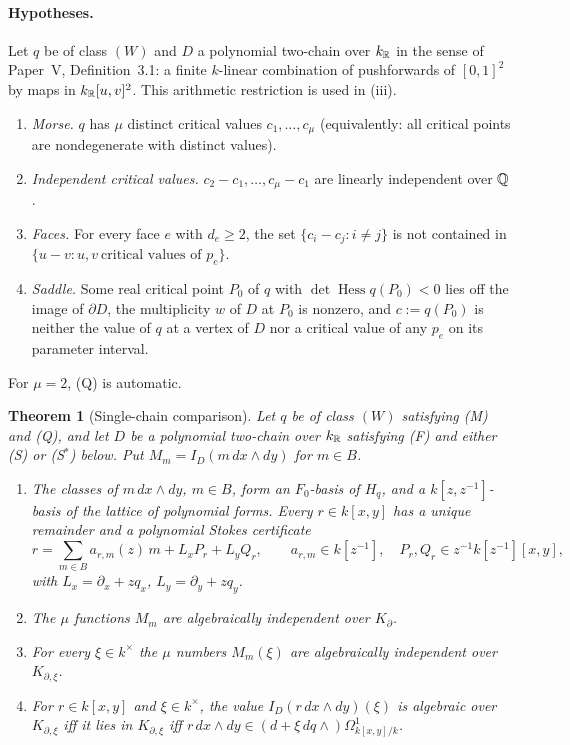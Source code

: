 \documentclass[11pt]{article}
\numberwithin{equation}{section}
\newtheorem{theorem}{Theorem}[section]
\theoremstyle{definition}
\theoremstyle{remark}
\newcommand{\Hq}{H_q}
\newcommand{\dd}{\,d}
\begin{document}
\paragraph{Hypotheses.} Let $q$ be of class $(W)$ and $D$ a polynomial two-chain
over $k_\mathbb R$ in the sense of Paper~V, Definition~3.1: a finite $k$-linear
combination of pushforwards of $[0,1]^2$ by maps in $k_\mathbb R[u,v]^2$. This
arithmetic restriction is used in (iii).
\begin{enumerate}[label=\textup{(\Alph*)},leftmargin=2.6em]
\item[(M)] \emph{Morse.} $q$ has $\mu$ distinct critical values
 $c_1,\dots,c_\mu$ (equivalently: all critical points are nondegenerate with
 distinct values).
\item[(Q)] \emph{Independent critical values.} $c_2-c_1,\dots,c_\mu-c_1$ are
 linearly independent over $\mathbb Q$.
\item[(F)] \emph{Faces.} For every face $e$ with $d_e\ge2$, the set
 $\{c_i-c_j:i\ne j\}$ is not contained in
 $\{u-v: u,v\ \text{critical values of }p_e\}$.
\item[(S)] \emph{Saddle.} Some real critical point $P_0$ of $q$ with
 $\det\operatorname{Hess}q(P_0)<0$ lies off the image of $\partial D$, the
 multiplicity $w$ of $D$ at $P_0$ is nonzero, and $c:=q(P_0)$ is neither the
 value of $q$ at a vertex of $D$ nor a critical value of any $p_e$ on its
 parameter interval.
\end{enumerate}
For $\mu=2$, (Q) is automatic.

\begin{theorem}[Single-chain comparison]\label{thm:main}
Let $q$ be of class $(W)$ satisfying \textup{(M)} and \textup{(Q)}, and let $D$
be a polynomial two-chain over $k_\mathbb R$ satisfying \textup{(F)} and either \textup{(S)} or \textup{(S$^*$)} below. Put
$M_m=I_D(m\dd x\wedge dy)$ for $m\in B$.
\begin{enumerate}[label=\textup{(\roman*)},leftmargin=2.4em]
\item The classes of $m\,dx\wedge dy$, $m\in B$, form an $F_0$-basis of $\Hq$,
 and a $k[z,z^{-1}]$-basis of the lattice of polynomial forms. Every
 $r\in k[x,y]$ has a unique remainder and a polynomial Stokes certificate
 \[
  r=\sum_{m\in B}a_{r,m}(z)\,m+L_xP_r+L_yQ_r,\qquad a_{r,m}\in k[z^{-1}],\quad
  P_r,Q_r\in z^{-1}k[z^{-1}][x,y],
 \]
 with $L_x=\partial_x+zq_x$, $L_y=\partial_y+zq_y$.
\item The $\mu$ functions $M_m$ are algebraically independent over $K_\partial$.
\item For every $\xi\in k^\times$ the $\mu$ numbers $M_m(\xi)$ are algebraically
 independent over $K_{\partial,\xi}$.
\item For $r\in k[x,y]$ and $\xi\in k^\times$, the value $I_D(r\dd x\wedge dy)(\xi)$
 is algebraic over $K_{\partial,\xi}$ iff it lies in $K_{\partial,\xi}$ iff
 $r\,dx\wedge dy\in(d+\xi\,dq\wedge)\Omega^1_{k[x,y]/k}$.
\end{enumerate}
\end{theorem}
\end{document}

